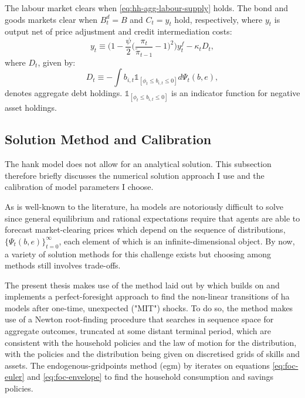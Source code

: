 \documentclass[a4paper,12pt]{article} %
\numberwithin{equation}{section} %
\numberwithin{figure}{section}
\numberwithin{table}{section}
\begin{document}
The labour market clears when \eqref{eq:hh-agg-labour-supply} holds. The bond and goods markets clear when $B_t^d = B$ and $C_t = y_t$ hold, respectively, where $y_t$ is output net of price adjustment and credit intermediation costs:
\begin{equation}
    y_t \equiv \Bigg( 1 - \frac{\psi}{2} \Bigg( \frac{\pi_t}{\tilde{\pi}_{t-1}} - 1 \Bigg)^2 \Bigg) y_t^f - \kappa_t D_t, \label{eq:effective-gdp}
\end{equation}
where $D_t$, given by:  %
\begin{equation}
    D_t \equiv - \int b_{i,t} \mathbb{1}_{[\phi_t \le b_{i,t} \le 0]} d \Psi_t (b,e), \label{eq:agg-debt}
\end{equation}
denotes aggregate debt holdings. $\mathbb{1}_{[\phi_t \le b_{i,t} \le 0]}$ is an indicator function for negative asset holdings.

\subsection{Solution Method and Calibration}
\label{sec:model-solution}

The \Gls{hank} model does not allow for an analytical solution. This subsection therefore briefly discusses the numerical solution approach I use and the calibration of model parameters I choose.

As is well-known to the literature, \Gls{ha} models are notoriously difficult to solve since general equilibrium and rational expectations require that agents are able to forecast market-clearing prices which depend on the sequence of distributions, $\{ \Psi_t (b,e) \}_{t=0}^{\infty} $, each element of which is an infinite-dimensional object. By now, a variety of solution methods for this challenge exists but choosing among methods still involves trade-offs. 

The present thesis makes use of the method laid out by \textcite{boehl2023econpizza} which builds on \textcite{auclert2021} and implements a perfect-foresight approach to find the non-linear transitions of \Gls{ha} models after one-time, unexpected ("MIT") shocks. To do so, the method makes use of a Newton root-finding procedure that searches in sequence space for aggregate outcomes, truncated at some distant terminal period, which are consistent with the household policies and the law of motion for the distribution, with the policies and the distribution being given on discretised grids of skills and assets. The endogenous-gridpoints method (\Gls{egm}) by \textcite{carroll2006} iterates on equations \eqref{eq:foc-euler} and \eqref{eq:foc-envelope} to find the household consumption and savings policies.
\end{document}
